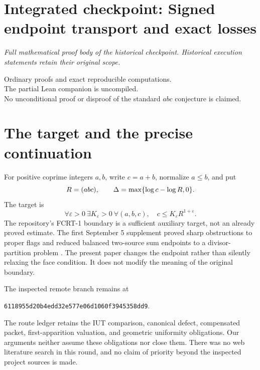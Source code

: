 \clearpage
\begingroup
\let\rad\relax
\newcommand{\rad}{\operatorname{rad}}
\let\F\relax
\newcommand{\F}{\mathcal F}
\let\B\relax
\newcommand{\B}{\mathcal B}
\section*{Integrated checkpoint: Signed endpoint transport and exact losses}
\label{checkpoint:signed}
\noindent\textit{Full mathematical proof body of the historical checkpoint. Historical execution statements retain their original scope.}\medskip


\begin{center}\small
Ordinary proofs and exact reproducible computations.\\
The partial Lean companion is uncompiled.\\
No unconditional proof or disproof of the standard \(abc\) conjecture is claimed.
\end{center}


\section{The target and the precise continuation}
For positive coprime integers \(a,b\), write \(c=a+b\), normalize \(a\le b\), and put
\[
 R=\rad(abc),\qquad \Delta=\max\{\log c-\log R,0\}.
\]
The target is
\begin{equation}\label{signed:eq:abc}
 \forall\varepsilon>0\ \exists K_\varepsilon>0\ \forall(a,b,c),\quad
 c\le K_\varepsilon R^{1+\varepsilon}.
\end{equation}
The repository's FCRT-1 boundary is a sufficient auxiliary target, not an already proved estimate. The first September 5 supplement proved sharp obstructions to proper flags and reduced balanced two-source sum endpoints to a divisor-partition problem \cite{signed:previous}. The present paper changes the endpoint rather than silently relaxing the face condition. It does not modify the meaning of the original boundary.

The inspected remote branch remains at
\begin{center}\small\texttt{6118955d20b4edd32e577e06d1060f3945358dd9}.\end{center}
The route ledger \cite{signed:ledger} retains the IUT comparison, canonical defect, compensated packet, first-apparition valuation, and geometric uniformity obligations. Our arguments neither assume these obligations nor close them. There was no web literature search in this round, and no claim of priority beyond the inspected project sources is made.

